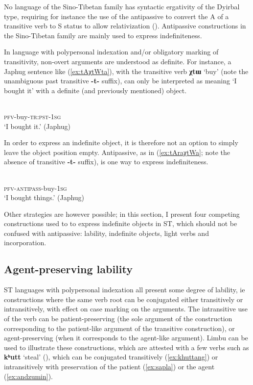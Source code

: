 \documentclass[oneside,a4paper,11pt]{article}
\newcommand{\ipa}[1]{{\phon\textbf{#1}}}
\begin{document}
No language of the Sino-Tibetan family has syntactic ergativity of the Dyirbal type, requiring for instance the use of the antipassive to convert the A  of a transitive verb to S status to allow relativization (\citealt[170]{dixon94erg}). Antipassive constructions in the Sino-Tibetan family are mainly used to express indefiniteness.

In language with polypersonal indexation and/or obligatory marking of transitivity, non-overt arguments are understood as definite. For instance, a Japhug sentence like (\ref{ex:tAχtWta}), with the transitive verb \ipa{χtɯ} `buy' (note the unambiguous past transitive \ipa{-t-} suffix), can only be interpreted as meaning `I bought it' with a definite (and previously mentioned) object.

\begin{exe}
\ex \label{ex:tAχtWta}
\gll \ipa{tɤ-χtɯ-t-a} \\
\textsc{pfv}-buy-\textsc{tr:pst-1sg} \\
\glt `I bought it.' (Japhug)
\end{exe}

In order to express an indefinite object, it is therefore not an option to simply leave the object position empty. Antipassive, as in (\ref{ex:tAraχtWa}; note the absence of transitive \ipa{-t-} suffix), is one way to express indefiniteness. 

\begin{exe}
\ex \label{ex:tAraχtWa}
\gll \ipa{tɤ-ra-χtɯ-a} \\
\textsc{pfv}-\textsc{antipass}-buy-\textsc{1sg} \\
\glt `I bought things.' (Japhug)
\end{exe}

Other strategies are however possible; in this section, I present four competing constructions used to to express indefinite objects in ST, which should not be confused with antipassive: lability, indefinite objects, light verbs and incorporation.  

\subsection{Agent-preserving lability} \label{sec:labile}
ST languages with polypersonal indexation all present some degree of lability, ie constructions where the same verb root can be conjugated either transitively or intransitively, with effect on case marking on the arguments. The intransitive use of the verb can be patient-preserving (the sole argument of the construction corresponding to the patient-like argument of the transitive construction), or agent-preserving (when it corresponds to the agent-like argument).  Limbu can be used to illustrate these constructions, which are attested with a few verbs such as  \ipa{kʰutt} `steal' (\citealt[527]{driem91tangut}), which can be conjugated transitively (\ref{ex:khuttang}) or intransitively with preservation of the patient (\ref{ex:sapla}) or the agent (\ref{ex:andzumin}).
\end{document}
